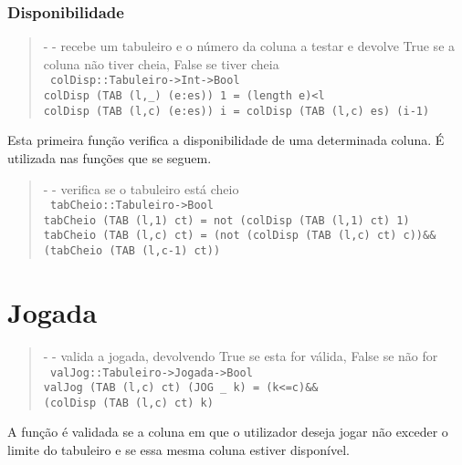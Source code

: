 \documentclass[a4paper,titlepage]{scrreprt}
\begin{document}
		\subsubsection{Disponibilidade}
			\begin{quote}
				{\small - - recebe um tabuleiro e o número da coluna a testar e devolve True se a coluna não tiver cheia, False se tiver cheia\\}
				{\tt
				colDisp::Tabuleiro->Int->Bool\\
				colDisp (TAB (l,\_) (e:es)) 1 = (length e)<l\\
				colDisp (TAB (l,c) (e:es)) i = colDisp (TAB (l,c) es) (i-1)
				}
			\end{quote}
			Esta primeira função verifica a disponibilidade de uma determinada coluna. É utilizada nas funções que se seguem.
			\begin{quote}
				{\small - - verifica se o tabuleiro está cheio\\}
				{\tt
				tabCheio::Tabuleiro->Bool\\
				tabCheio (TAB (l,1) ct) = not (colDisp (TAB (l,1) ct) 1)\\
				tabCheio (TAB (l,c) ct) = (not (colDisp (TAB (l,c) ct) c))\&\&\\
				(tabCheio (TAB (l,c-1) ct))
				}
			\end{quote}
	\section{Jogada}
		\begin{quote}
			{\small - - valida a jogada, devolvendo True se esta for válida, False se não for\\}
			{\tt
			valJog::Tabuleiro->Jogada->Bool\\
			valJog (TAB (l,c) ct) (JOG \_ k) = (k<=c)\&\&\\(colDisp (TAB (l,c) ct) k)
			}
		\end{quote}
		A função é validada se a coluna em que o utilizador deseja jogar não exceder o limite do tabuleiro e se essa mesma coluna estiver
		disponível.
\end{document}
